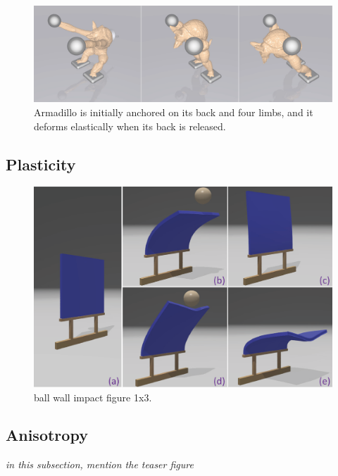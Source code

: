 \begin{figure}[t]
  \centering
  \includegraphics[width=\linewidth]{./figs/demo_pull_armadillo.eps}
  \caption{\label{fig:3}
  Armadillo is initially anchored on its back and four limbs, and it deforms elastically when its back is released.
}
\end{figure}

\subsection{Plasticity}

\begin{figure}[h]
  \centering
  \includegraphics[width=\linewidth]{./figs/demo_impact_upside.eps}
  \caption{\label{fig:4}
  ball wall impact figure 1x3.
}
\end{figure}

\subsection{Anisotropy}

\emph{in this subsection, mention the teaser figure}

